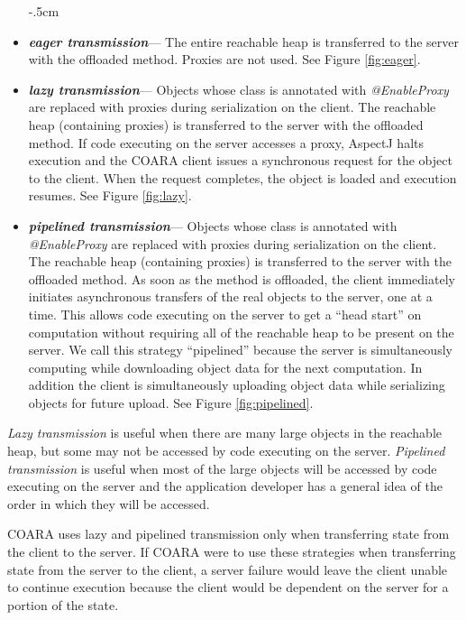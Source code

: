 \documentclass[10pt,journal,cspaper,compsoc]{IEEEtran}
\begin{document}
\begin{itemize}
\advance\leftskip-.5cm
  \item \textbf{\emph{eager transmission}}--- The entire reachable heap is transferred to the server with the offloaded method.  Proxies are not used.  See Figure \ref{fig:eager}.
  \item \textbf{\emph{lazy transmission}}--- Objects whose class is annotated with \emph{@EnableProxy} are replaced with proxies during serialization on the client.  The reachable heap (containing proxies) is transferred to the server with the offloaded method.  If code executing on the server accesses a proxy, AspectJ halts execution and the COARA client issues a synchronous request for the object to the client.  When the request completes, the object is loaded and execution resumes.  See Figure \ref{fig:lazy}.
  \item \textbf{\emph{pipelined transmission}}---  Objects whose class is annotated with \emph{@EnableProxy} are replaced with proxies during serialization on the client.  The reachable heap (containing proxies) is transferred to the server with the offloaded method. As soon as the method is offloaded, the client immediately initiates asynchronous transfers of the real objects to the server, one at a time.  This allows code executing on the server to get a ``head start'' on computation without requiring all of the reachable heap to be present on the server.  We call this strategy ``pipelined'' because the server is simultaneously computing while downloading object data for the next computation.  In addition the client is simultaneously uploading object data while serializing objects for future upload. See Figure \ref{fig:pipelined}.
\end{itemize}



\emph{Lazy transmission} is useful when there are many large objects in the reachable heap, but some may not be accessed by code executing on the server. \emph{Pipelined transmission} is useful when most of the large objects will be accessed by code executing on the server and the application developer has a general idea of the order in which they will be accessed.

COARA uses lazy and pipelined transmission only when transferring state from the client to the server.  If COARA were to use these strategies when transferring state from the server to the client, a server failure would leave the client unable to continue execution because the client would be dependent on the server for a portion of the state.
\end{document}
